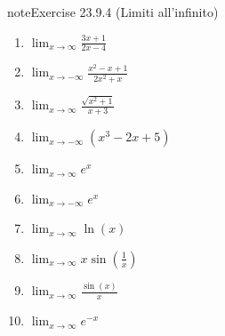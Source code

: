 \documentclass[letterpaper,10pt,italian]{jupyterBook}
\begin{document}
\begin{sphinxadmonition}{note}{Exercise 23.9.4 (Limiti all’infinito)}


\begin{enumerate}
%
\item {} 
\sphinxAtStartPar
\(\lim_{x \to \infty} \frac{3x + 1}{2x - 4}\)

\item {} 
\sphinxAtStartPar
\(\lim_{x \to -\infty} \frac{x^2 - x + 1}{2x^2 + x}\)

\item {} 
\sphinxAtStartPar
\(\lim_{x \to \infty} \frac{\sqrt{x^2 + 1}}{x + 3}\)

\item {} 
\sphinxAtStartPar
\(\lim_{x \to -\infty} (x^3 - 2x + 5)\)

\item {} 
\sphinxAtStartPar
\(\lim_{x \to \infty} e^x\)

\item {} 
\sphinxAtStartPar
\(\lim_{x \to -\infty} e^x\)

\item {} 
\sphinxAtStartPar
\(\lim_{x \to \infty} \ln(x)\)

\item {} 
\sphinxAtStartPar
\(\lim_{x \to \infty} x \sin\left(\frac{1}{x}\right)\)

\item {} 
\sphinxAtStartPar
\(\lim_{x \to \infty} \frac{\sin(x)}{x}\)

\item {} 
\sphinxAtStartPar
\(\lim_{x \to \infty} e^{-x}\)

\end{enumerate}
\end{sphinxadmonition}
 \label{exercise:ch/infinitesimal_calculus/analysis-problems-exercise-4}
\end{document}
